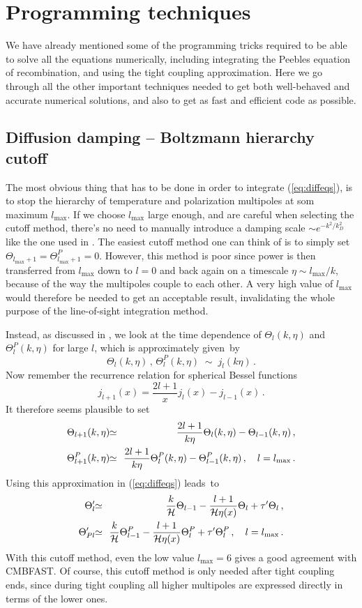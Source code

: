 \documentclass[twocolumn,nofootinbib,amsmath,amssymb]{revtex4}
\newcommand{\be}{\begin{equation}}
\newcommand{\ee}{\end{equation}}
\newcommand{\ba}{\begin{eqnarray}}
\newcommand{\ea}{\end{eqnarray}}
\newcommand{\hs}{\hspace{-1.12mm}}
\newcommand{\eqsimeq}{\hs & \simeq & \hs}
\begin{document}
\section{Programming techniques}
\label{cha:programming}

We have already mentioned some of the programming tricks required to be able to
solve all the equations numerically, including integrating the Peebles equation
of recombination, and using the tight coupling approximation. Here we go
through all the other important techniques needed to get both well-behaved and
accurate numerical solutions, and also to get as fast and efficient code as
possible.


\subsection{Diffusion damping -- Boltzmann hierarchy cutoff}
\label{cha:diffusiondamping}

The most obvious thing that has to be done in order to integrate
(\ref{eq:diffeqs}), is to stop the hierarchy of temperature and polarization
multipoles at som maximum $l_{\max}$. If we choose $l_{\max}$ large enough, and
are careful when selecting the cutoff method, there's no need to manually
introduce a damping scale $\sim e^{-k^2/k_D^2}$ like the one used in
\cite{Dodelson}. The easiest cutoff method one can think of is to simply set
$\Theta_{l_{\max}+1} = \Theta^P_{l_{\max}+1} = 0$. However, this method is poor
since power is then transferred from $l_{\max}$ down to $l=0$ and back again on
a timescale $\eta \sim l_{\max}/k$, because of the way the multipoles couple to
each other. A very high value of $l_{\max}$ would therefore be needed to get an
acceptable result, invalidating the whole purpose of the line-of-sight
integration method.

Instead, as discussed in \cite{Ma_Bert}, we look at the time dependence of
$\Theta_l(k,\eta)$ and $\Theta^P_l(k,\eta)$ for large $l$, which is
approximately given~by
\be
  \Theta_l(k,\eta) \, , \, \Theta^P_l(k,\eta) \;\sim\; j_l(k\eta) \, .
\ee
Now remember the recurrence relation for spherical Bessel functions
\be
  j_{l+1}(x) = \frac{2l+1}{x} j_l(x) - j_{l-1}(x) \, .
\ee
It therefore seems plausible to set
\ba
  \Theta_{l+1}(k,\eta) \eqsimeq
    \frac{2l+1}{k\eta} \Theta_l(k,\eta) - \Theta_{l-1}(k,\eta) \, , \\
  \Theta^P_{l+1}(k,\eta) \eqsimeq
    \frac{2l+1}{k\eta} \Theta^P_l(k,\eta) - \Theta^P_{l-1}(k,\eta) \, ,
  \quad l = l_{\max} \, . \nonumber
\ea
Using this approximation in (\ref{eq:diffeqs}) leads~to
\ba
  \Theta'_l \eqsimeq \frac{k}{\cal H} \Theta_{l-1} -
    \frac{l+1}{{\cal H} \eta(x)} \Theta_l + \tau' \Theta_l \, , \\
  \Theta'_{Pl} \eqsimeq \frac{k}{\cal H} \Theta^P_{l-1} -
    \frac{l+1}{{\cal H} \eta(x)} \Theta^P_l + \tau' \Theta^P_l \, ,
  \quad l = l_{\max} \, . \nonumber
\ea
With this cutoff method, even the low value $l_{\max} = 6$ gives a good
agreement with CMBFAST. Of course, this cutoff method is only needed after
tight coupling ends, since during tight coupling all higher multipoles are
expressed directly in terms of the lower ones.
\end{document}
